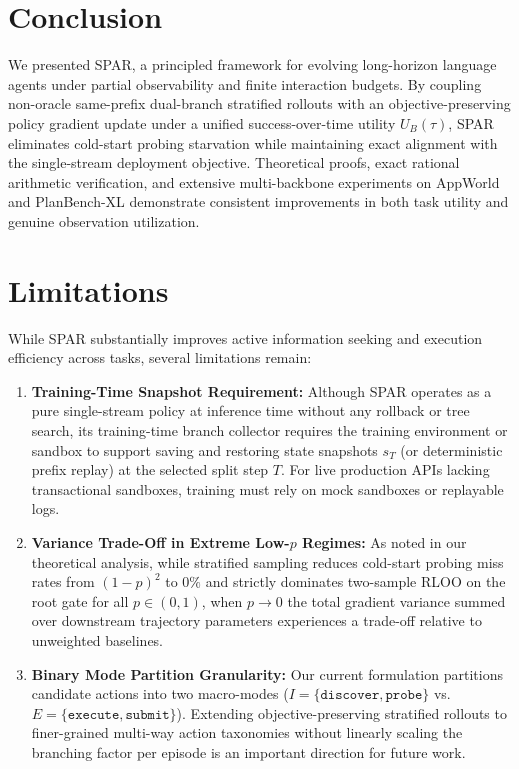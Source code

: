 \documentclass[11pt]{article}
\theoremstyle{definition}
\theoremstyle{remark}
\newcommand{\prism}{\textsc{SPAR}}
\newcommand{\UB}{U_B}
\begin{document}
\section{Conclusion}
\label{sec:conclusion}
We presented \prism{}, a principled framework for evolving long-horizon language agents under partial observability and finite interaction budgets. By coupling non-oracle same-prefix dual-branch stratified rollouts with an objective-preserving policy gradient update under a unified success-over-time utility $\UB(\tau)$, \prism{} eliminates cold-start probing starvation while maintaining exact alignment with the single-stream deployment objective. Theoretical proofs, exact rational arithmetic verification, and extensive multi-backbone experiments on AppWorld and PlanBench-XL demonstrate consistent improvements in both task utility and genuine observation utilization.

\section*{Limitations}
\label{sec:limitations}
While \prism{} substantially improves active information seeking and execution efficiency across tasks, several limitations remain:
\begin{enumerate}[leftmargin=*, nosep, topsep=2pt]
    \item \textbf{Training-Time Snapshot Requirement:} Although \prism{} operates as a pure single-stream policy at inference time without any rollback or tree search, its training-time branch collector requires the training environment or sandbox to support saving and restoring state snapshots $s_T$ (or deterministic prefix replay) at the selected split step $T$. For live production APIs lacking transactional sandboxes, training must rely on mock sandboxes or replayable logs.
    \item \textbf{Variance Trade-Off in Extreme Low-$p$ Regimes:} As noted in our theoretical analysis, while stratified sampling reduces cold-start probing miss rates from $(1-p)^2$ to $0\%$ and strictly dominates two-sample RLOO on the root gate for all $p \in (0, 1)$, when $p \to 0$ the total gradient variance summed over downstream trajectory parameters experiences a trade-off relative to unweighted baselines.
    \item \textbf{Binary Mode Partition Granularity:} Our current formulation partitions candidate actions into two macro-modes ($I = \{\texttt{discover}, \texttt{probe}\}$ vs.\ $E = \{\texttt{execute}, \texttt{submit}\}$). Extending objective-preserving stratified rollouts to finer-grained multi-way action taxonomies without linearly scaling the branching factor per episode is an important direction for future work.
\end{enumerate}
\end{document}
